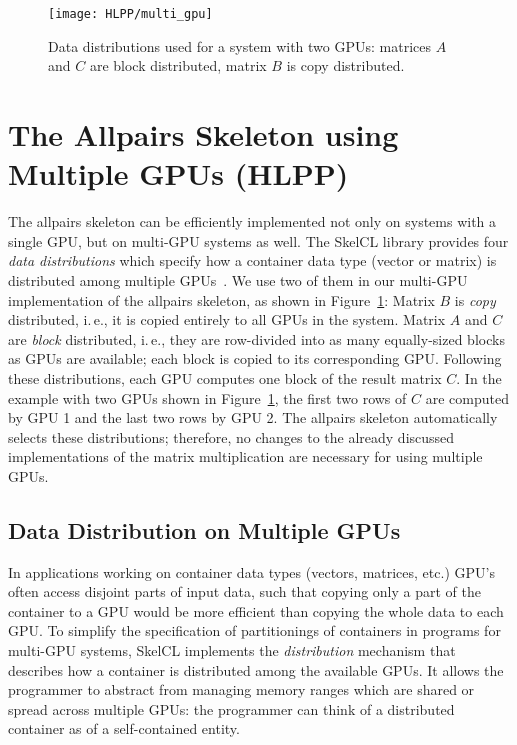 \begin{figure}[b]
  \centering
  \texttt{[image: HLPP/multi\_gpu]}
  \caption{Data distributions used for a system with two GPUs: matrices $A$ and $C$ are block distributed, matrix $B$ is copy distributed.}
  \label{fig:multi_gpu}
\end{figure}

\section{The Allpairs Skeleton using Multiple GPUs (HLPP)}
\label{sec:multi_gpu}
The allpairs skeleton can be efficiently implemented not only on systems with a single GPU, but on multi-GPU systems as well.
The SkelCL library provides four \emph{data distributions} which specify how a container data type (vector or matrix) is distributed among multiple GPUs~\cite{StKG-12}.
We use two of them in our multi-GPU implementation of the allpairs skeleton, as shown in Figure~\ref{fig:multi_gpu}:
Matrix $B$ is \emph{copy} distributed, i.\,e., it is copied entirely to all GPUs in the system.
Matrix $A$ and $C$ are \emph{block} distributed, i.\,e., they are row-divided into as many equally-sized blocks as GPUs are available;
each block is copied to its corresponding GPU.
Following these distributions, each GPU computes one block of the result matrix $C$.
In the example with two GPUs shown in Figure~\ref{fig:multi_gpu}, the first two rows of $C$ are computed by GPU 1 and the last two rows by GPU 2.
The allpairs skeleton automatically selects these distributions; therefore, no changes to the already discussed implementations of the matrix multiplication are necessary for using multiple GPUs.




\subsection{Data Distribution on Multiple GPUs}
In applications working on container data types (vectors, matrices, etc.) GPU's often access disjoint parts of input data, such that copying only a part of the container to a GPU would be more efficient than copying the whole data to each GPU. To simplify the specification of partitionings of containers in programs for multi-GPU systems, SkelCL implements the \emph{distribution} mechanism that describes how a container is distributed among the available GPUs.
It allows the programmer to abstract from managing memory ranges which are shared or spread across multiple GPUs:
the programmer can think of a distributed container as of a self-contained entity.

